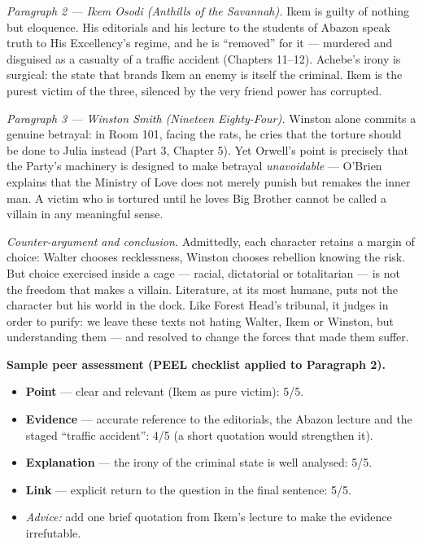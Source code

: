 \documentclass[11pt]{article}
\begin{document}
\emph{Paragraph 2 — Ikem Osodi (Anthills of the Savannah).} Ikem is guilty of nothing but eloquence. His editorials and his lecture to the students of Abazon speak truth to His Excellency's regime, and he is ``removed'' for it — murdered and disguised as a casualty of a traffic accident (Chapters 11--12). Achebe's irony is surgical: the state that brands Ikem an enemy is itself the criminal. Ikem is the purest victim of the three, silenced by the very friend power has corrupted.

\emph{Paragraph 3 — Winston Smith (Nineteen Eighty-Four).} Winston alone commits a genuine betrayal: in Room 101, facing the rats, he cries that the torture should be done to Julia instead (Part 3, Chapter 5). Yet Orwell's point is precisely that the Party's machinery is designed to make betrayal \emph{unavoidable} — O'Brien explains that the Ministry of Love does not merely punish but remakes the inner man. A victim who is tortured until he loves Big Brother cannot be called a villain in any meaningful sense.

\emph{Counter-argument and conclusion.} Admittedly, each character retains a margin of choice: Walter chooses recklessness, Winston chooses rebellion knowing the risk. But choice exercised inside a cage — racial, dictatorial or totalitarian — is not the freedom that makes a villain. Literature, at its most humane, puts not the character but his world in the dock. Like Forest Head's tribunal, it judges in order to purify: we leave these texts not hating Walter, Ikem or Winston, but understanding them — and resolved to change the forces that made them suffer.

\bigskip
\textbf{Sample peer assessment (PEEL checklist applied to Paragraph 2).}\par
\begin{itemize}
\item \textbf{Point} — clear and relevant (Ikem as pure victim): 5/5.
\item \textbf{Evidence} — accurate reference to the editorials, the Abazon lecture and the staged ``traffic accident'': 4/5 (a short quotation would strengthen it).
\item \textbf{Explanation} — the irony of the criminal state is well analysed: 5/5.
\item \textbf{Link} — explicit return to the question in the final sentence: 5/5.
\item \emph{Advice:} add one brief quotation from Ikem's lecture to make the evidence irrefutable.
\end{itemize}
\end{document}
